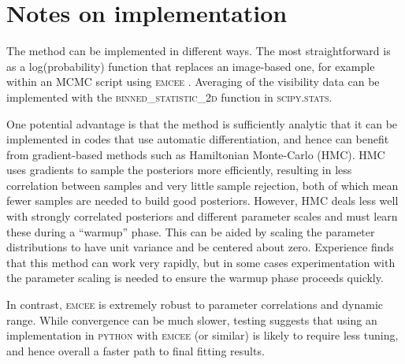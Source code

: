 \documentclass[fleqn,usenatbib]{mnras}
\begin{document}

\appendix

\section{Notes on implementation}

The method can be implemented in different ways. The most straightforward is as a log(probability) function that replaces an image-based one, for example within an MCMC script using \textsc{emcee} \citep{2013PASP..125..306F}. Averaging of the visibility data can be implemented with the \textsc{binned\_statistic\_2d} function in \textsc{scipy.stats}.

One potential advantage is that the method is sufficiently analytic that it can be implemented in codes that use automatic differentiation, and hence can benefit from gradient-based methods such as Hamiltonian Monte-Carlo (HMC). HMC uses gradients to sample the posteriors more efficiently, resulting in less correlation between samples and very little sample rejection, both of which mean fewer samples are needed to build good posteriors. However, HMC deals less well with strongly correlated posteriors and different parameter scales and must learn these during a ``warmup'' phase. This can be aided by scaling the parameter distributions to have unit variance and be centered about zero. Experience finds that this method can work very rapidly, but in some cases experimentation with the parameter scaling is needed to ensure the warmup phase proceeds quickly.

In contrast, \textsc{emcee} is extremely robust to parameter correlations and dynamic range. While convergence can be much slower, testing suggests that using an implementation in \textsc{python} with \textsc{emcee} (or similar) is likely to require less tuning, and hence overall a faster path to final fitting results.

\bsp	%
\label{lastpage}
\end{document}
